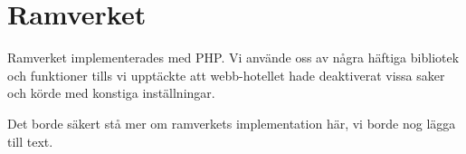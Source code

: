 \section{Ramverket}
Ramverket implementerades med PHP. Vi använde oss av några häftiga
bibliotek och funktioner tills vi upptäckte att webb-hotellet hade
deaktiverat vissa saker och körde med konstiga inställningar.

Det borde säkert stå mer om ramverkets implementation här, vi borde nog
lägga till text.

